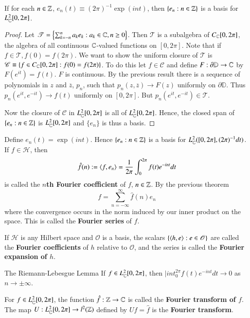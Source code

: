 \begin{thm}
    If for each $n \in \mathbb Z$, $e_n(t) \equiv (2\pi)^{-1}\exp(int)$, then $\{e_n:n \in \mathbb Z\}$ is a basis for $L_{\mathbb C}^2[0,2\pi]$.
\end{thm}
\begin{proof}
    Let $\mathscr{T} = \left\{\sum_{k=-n}^na_ke_k:a_k \in \mathbb C,n\geq 0\right\}$. Then $\mathscr{T}$ is a subalgebra of $C_{\mathbb C}[0,2\pi]$, the algebra of all continuous $\mathbb C$-valued functions on $[0,2\pi]$. Note that if $f \in \mathscr{T}, f(0) = f(2\pi)$. We want to show the uniform closure of $\mathscr{T}$ is $\mathscr{C} \equiv \{f \in C_{\mathbb C}[0,2\pi]:f(0) = f(2\pi)\}$. To do this let $f \in \mathscr{C}$ and define $F:\partial\mathbb{D}\rightarrow \mathbb C$ by $F(e^{it}) = f(t)$. $F$ is continuous. By the previous result there is a sequence of polynomials in $z$ and $\overline{z}$, $p_n$, such that $p_n(z,\overline{z})\rightarrow F(z)$ uniformly on $\partial \mathbb{D}$. Thus $p_n(e^{it},e^{-it})\rightarrow f(t)$ uniformly on $[0,2\pi]$. But $p_n(e^{it},e^{-it}) \in \mathscr{T}$.

    Now the closure of $\mathscr{C}$ in $L_{\mathbb C}^2[0,2\pi]$ is all of $L_{\mathbb C}^2[0,2\pi]$. Hence, the closed span of $\{e_n:n \in \mathbb Z\}$ is $L_{\mathbb C}^2[0,2\pi]$ and $\{e_n\}$ is thus a basis.
\end{proof}

Define $e_n(t) = \exp(int)$. Hence $\{e_n:n \in \mathbb Z\}$ is a basis for $L_{\mathbb C}^2([0,2\pi],(2\pi)^{-1}dt)$. If $f \in \mathscr{H}$, then $$\hat{f}(n) := \left\langle f, e_n\right\rangle = \frac{1}{2\pi}\int_0^{2\pi}f(t)e^{-int}dt$$
is called the \textbf{$n$th Fourier coefficient} of $f$, $n \in \mathbb Z$. By the previous theorem $$f = \sum_{n=-\infty}^{\infty}\hat{f}(n)e_n$$
where the convergence occurs in the norm induced by our inner product on the space. This is called the \textbf{Fourier series} of $f$.

If $\mathscr{H}$ is any Hilbert space and $\mathscr{O}$ is a basis, the scalars $\{\left\langle h, e\right\rangle:e \in \mathscr{O}\}$ are called the \textbf{Fourier coefficients} of $h$ relative to $\mathscr{O}$, and the series is called the \textbf{Fourier expansion of $h$}.

\begin{thm}{The Riemann-Lebesgue Lemma}
    If $f \in L_{\mathbb C}^2[0,2\pi]$, then $|int_0^{2\pi}f(t)e^{-int}dt \rightarrow 0$ as $n\rightarrow \pm\infty$.
\end{thm}

For $f \in L_{\mathbb C}^2[0,2\pi]$, the function $\hat{f}:\mathbb Z\rightarrow \mathbb C$ is called the \textbf{Fourier transform of $f$}. The map $U:L_{\mathbb C}^2[0,2\pi]\rightarrow l^2(\mathbb Z)$ defined by $Uf = \hat{f}$ is the \textbf{Fourier transform}.

